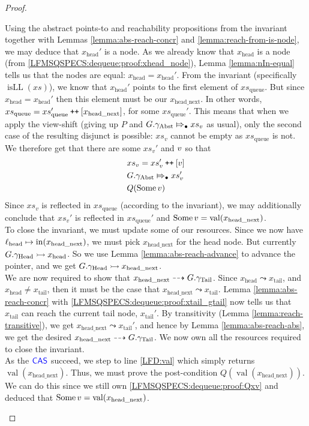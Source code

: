 \documentclass[a4paper, 10pt]{report}
\theoremstyle{definition}
\newcommand{\xsc}{xs}
\newcommand{\xsqueue}{xs_{\mathrm{queue}}}
\newcommand{\isLL}{\operatorname{isLL}}
\newcommand{\locN}[1]{\loc_{\mathrm{#1}}}
\newcommand{\lochead}{\locN{head}}
\newcommand{\nIn}[1]{\operatorname{in}(#1)}
\newcommand{\nVal}[1]{\operatorname{val}(#1)}
\newcommand{\node}{x}
\newcommand{\nodeN}[1]{\node_{\mathrm{#1}}}
\newcommand{\nodehead}{\nodeN{head}}
\newcommand{\nodetail}{\nodeN{tail}}
\newcommand{\nodeheadnext}{\nodeN{head\_next}}
\newcommand{\absvalue}{\val}
\newcommand{\absvalueList}{xs_v}
\newcommand{\Qg}{G}
\newcommand{\gabst}{\gname_{\mathrm{Abst}}}
\newcommand{\ghead}{\gname_{\mathrm{Head}}}
\newcommand{\gtail}{\gname_{\mathrm{Tail}}}
\newcommand\catenate{\mathbin{\text{\ttfamily\upshape ++}}}
\newcommand{\abstractstateauth}[2]{#1 \Mapsto_{\bullet} #2}
\newcommand{\reach}[2]{#1 \leadsto #2}
\newcommand{\ar}[2]{#1 \dashrightarrow #2}
\newcommand{\ap}[2]{#1 \rightarrowtail #2}
\begin{document}
\begin{proof}
\begin{itemize}
\begin{itemize}
      Using the abstract points-to and reachability propositions from the invariant together with Lemmas \ref{lemma:abs-reach-concr} and \ref{lemma:reach-from-is-node}, we may deduce that $\nodehead'$ is a node. As we already know that $\nodehead$ is a node (from \ref{LFMSQSPECS:dequeue:proof:xhead_node}), Lemma \ref{lemma:nIn-equal} tells us that the nodes are equal: $\nodehead = \nodehead'$. From the invariant (specifically $\isLL(\xsc)$), we know that $\nodehead'$ points to the first element of $\xsqueue$. But since $\nodehead = \nodehead'$ then this element must be our $\nodeheadnext$. In other words, $\xsqueue = \xsqueue' \catenate [\nodeheadnext]$, for some $\xsqueue'$.
      This means that when we apply the view-shift (giving up $P$ and $\abstractstateauth{\Qg.\gabst}{\absvalueList}$ as usual), only the second case of the resulting disjunct is possible: $\absvalueList$ cannot be empty as $\xsqueue$ is not. We therefore get that there are some $\absvalueList'$ and $\absvalue$ so that
      \begin{align}
        &\absvalueList = \absvalueList' \catenate [\absvalue]\\
        &\abstractstateauth{\Qg.\gabst}{\absvalueList'}\\
        &Q(\Some \absvalue)\label{LFMSQSPECS:dequeue:proof:Qxv}
      \end{align}
      Since $\absvalueList$ is reflected in $\xsqueue$ (according to the invariant), we may additionally conclude that $\absvalueList'$ is reflected in $\xsqueue'$ and $\Some \absvalue = \nVal{\nodeheadnext}$.\\
      To close the invariant, we must update some of our resources. Since we now have $\lochead \mapsto \nIn{\nodeheadnext}$, we must pick $\nodeheadnext$ for the head node. But currently $\ap{\Qg.\ghead}{\nodehead}$. So we use Lemma \ref{lemma:abs-reach-advance} to advance the pointer, and we get $\ap{\Qg.\ghead}{\nodeheadnext}$.\\
      We are now required to show that $\ar{\nodeheadnext}{\Qg.\gtail}$. Since $\reach{\nodehead}{\nodetail}$, and $\nodehead \neq \nodetail$, then it must be the case that $\reach{\nodeheadnext}{\nodetail}$. Lemma \ref{lemma:abs-reach-concr} with \ref{LFMSQSPECS:dequeue:proof:xtail_gtail} now tells us that $\nodetail$ can reach the current tail node, $\nodetail'$. By transitivity (Lemma \ref{lemma:reach-transitive}), we get $\reach{\nodeheadnext}{\nodetail'}$, and hence by Lemma \ref{lemma:abs-reach-abs}, we get the desired $\ar{\nodeheadnext}{\Qg.\gtail}$. We now own all the resources required to close the invariant.\\
      As the $\textsf{\color{blue} CAS}$ succeed, we step to line \ref{LFD:val} which simply returns $\nVal{\nodeheadnext}$. Thus, we must prove the post-condition $Q(\nVal{\nodeheadnext})$. We can do this since we still own \ref{LFMSQSPECS:dequeue:proof:Qxv} and deduced that $\Some \absvalue = \nVal{\nodeheadnext}$.
    \end{itemize}


\end{itemize}
\end{proof}
\end{document}
